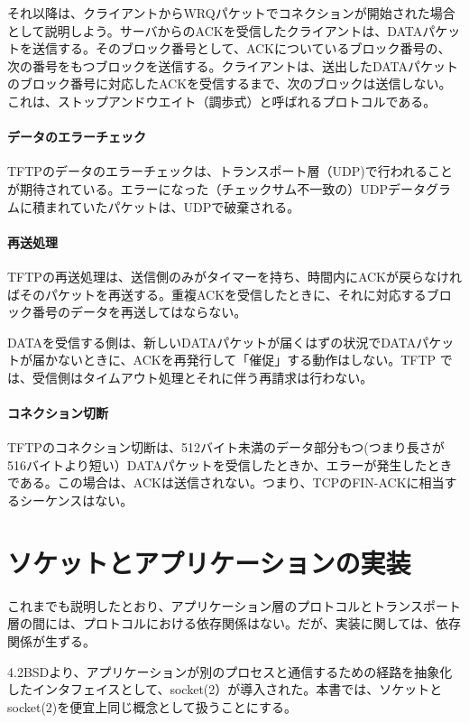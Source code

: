 それ以降は、クライアントからWRQパケットでコネクションが開始された場合として説明しよう。サーバからのACKを受信したクライアントは、DATAパケットを送信する。そのブロック番号として、ACKについているブロック番号の、次の番号をもつブロックを送信する。クライアントは、送出したDATAパケットのブロック番号に対応したACKを受信するまで、次のブロックは送信しない。これは、ストップアンドウエイト（調歩式）と呼ばれるプロトコルである。

\paragraph{データのエラーチェック}

TFTPのデータのエラーチェックは、トランスポート層（UDP)で行われることが期待されている。エラーになった（チェックサム不一致の）UDPデータグラムに積まれていたパケットは、UDPで破棄される。

\paragraph{再送処理}

TFTPの再送処理は、送信側のみがタイマーを持ち、時間内にACKが戻らなければそのパケットを再送する。重複ACKを受信したときに、それに対応するブロック番号のデータを再送してはならない。

DATAを受信する側は、新しいDATAパケットが届くはずの状況でDATAパケットが届かないときに、ACKを再発行して「催促」する動作はしない。TFTP では、受信側はタイムアウト処理とそれに伴う再請求は行わない。

\paragraph{コネクション切断}

TFTPのコネクション切断は、512バイト未満のデータ部分もつ(つまり長さが516バイトより短い）DATAパケットを受信したときか、エラーが発生したときである。この場合は、ACKは送信されない。つまり、TCPのFIN-ACKに相当するシーケンスはない。



\section{ソケットとアプリケーションの実装}
これまでも説明したとおり、アプリケーション層のプロトコルとトランスポート層の間には、プロトコルにおける依存関係はない。だが、実装に関しては、依存関係が生ずる。

4.2BSDより、アプリケーションが別のプロセスと通信するための経路を抽象化したインタフェイスとして、socket(2）が導入された。本書では、ソケットとsocket(2)を便宜上同じ概念として扱うことにする。

